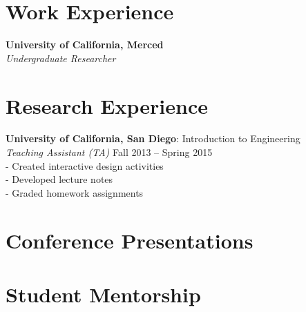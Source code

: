 \documentclass[line]{res}
\begin{document}
\begin{resume}
\section{Work Experience}
\vspace{0.1in}
%

\textbf{University of California, Merced} \\
\textit{Undergraduate Researcher} \\


\section{Research Experience}
\vspace{0.1in}

\textbf{University of California, San Diego}: Introduction to Engineering \\
\textit{Teaching Assistant (TA)} \hfill Fall 2013 -- Spring 2015 \\
- Created interactive design activities \\
- Developed lecture notes \\
- Graded homework assignments \\


\section{Conference Presentations}
\vspace{0.1in}
%


\section{Student Mentorship}
\vspace{0.1in}
%



\end{resume}
\end{document}
